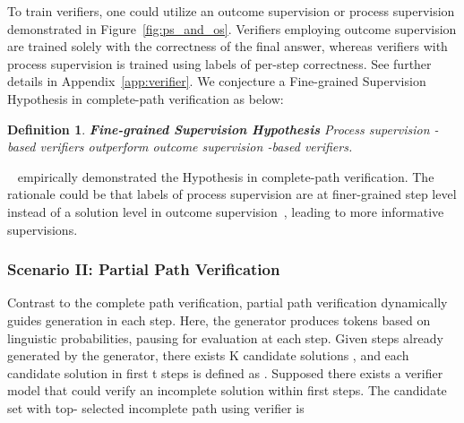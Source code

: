 \documentclass[11pt]{article}
\theoremstyle{plain}
\theoremstyle{claim}
\theoremstyle{rethinking}
\theoremstyle{researchquestion}
\theoremstyle{findings}
\theoremstyle{fact}
\newtheorem{definition}{Definition}\theoremstyle{lemma}
\theoremstyle{proper}
\theoremstyle{remark}
\begin{document}
To train verifiers, one could utilize an outcome supervision or process supervision demonstrated in Figure~\ref{fig:ps_and_os}. 
Verifiers employing outcome supervision
are trained solely with the correctness of the final answer, whereas verifiers with process supervision
is trained using labels of per-step correctness. See further details in Appendix~\ref{app:verifier}.
We conjecture a Fine-grained Supervision Hypothesis in complete-path verification as below:
\begin{definition}
\label{def:hypothesis}
   \textbf{Fine-grained Supervision Hypothesis} \textit{Process supervision -based verifiers  outperform outcome supervision -based verifiers}.
\end{definition}

~\citep{openai-process23}  empirically demonstrated  the Hypothesis in complete-path verification.
The rationale could be that labels of process supervision are at finer-grained step level instead of a solution level in outcome supervision~\citep{gsm8k21}, leading to  more informative supervisions. 





 
\subsubsection{Scenario II: Partial Path Verification} Contrast to the complete path verification, partial path verification dynamically guides generation in each step.
Here, the generator  produces tokens based on linguistic probabilities, pausing for evaluation at each step. Given  steps already generated by the generator, there exists K candidate solutions , and each  candidate  solution  in first t steps is defined as   .
Supposed there exists a verifier model  that could verify an incomplete solution within  first  steps. The  candidate set with top- selected incomplete path  using verifier  is 
\end{document}
